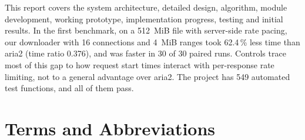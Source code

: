 \documentclass[11pt,a4paper]{report}
\begin{document}
This report covers the system architecture, detailed design, algorithm, module development, working prototype, implementation progress, testing and initial results. In the first benchmark, on a 512~MiB file with server-side rate pacing, our downloader with 16 connections and 4~MiB ranges took 62.4\,\% less time than aria2 (time ratio 0.376), and was faster in 30 of 30 paired runs. Controls trace most of this gap to how request start times interact with per-response rate limiting, not to a general advantage over aria2. The project has 549 automated test functions, and all of them pass.

\chapter*{Terms and Abbreviations}
\begingroup\small
\end{document}
